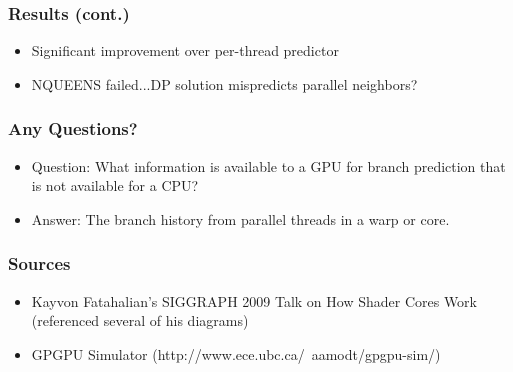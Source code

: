 \documentclass{beamer}
\begin{document}
\begin{frame}
 \frametitle{Results (cont.)}
\begin{itemize}
 \item Significant improvement over per-thread predictor
 \item NQUEENS failed...DP solution mispredicts parallel neighbors?
\end{itemize}

\end{frame}

\begin{frame}
 \frametitle{Any Questions?}
\begin{itemize}
 \item Question: What information is available to a GPU for branch prediction that is not available for a CPU?
 \item Answer: The branch history from parallel threads in a warp or core.
\end{itemize}

\end{frame}


\begin{frame}
	\frametitle{Sources}
	\begin{itemize}
		\item Kayvon Fatahalian's SIGGRAPH 2009 Talk on How Shader Cores Work (referenced several of his diagrams)
		\item GPGPU Simulator (http://www.ece.ubc.ca/~aamodt/gpgpu-sim/)
	\end{itemize}
\end{frame}
\end{document}
